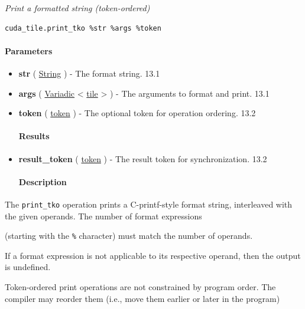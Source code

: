 \documentclass{article}
\begin{document}
\textit{Print a formatted string (token-ordered)}


\begin{lstlisting}
cuda_tile.print_tko %str %args %token
\end{lstlisting}

\paragraph{Parameters}

\begin{itemize}
\item \textbf{str} ( \href{https://docs.nvidia.com/cuda/tile-ir/latest/sections/operations.html#type-string}{String} ) - The format string. 13.1
\item \textbf{args} ( \href{https://docs.nvidia.com/cuda/tile-ir/latest/sections/operations.html#type-variadic}{Variadic} < \href{https://docs.nvidia.com/cuda/tile-ir/latest/sections/types.html#type-tile}{tile} > ) - The arguments to format and print. 13.1
\item \textbf{token} ( \href{https://docs.nvidia.com/cuda/tile-ir/latest/sections/operations.html#type-token}{token} ) - The optional token for operation ordering. 13.2


\paragraph{Results}

\item \textbf{result\_token} ( \href{https://docs.nvidia.com/cuda/tile-ir/latest/sections/operations.html#type-token}{token} ) - The result token for synchronization. 13.2


\paragraph{Description}

\end{itemize}
The \texttt{print\_tko} operation prints a C-printf-style format string, interleaved with the given operands. The number of format expressions

(starting with the \texttt{\%} character) must match the number of operands.

If a format expression is not applicable to its respective operand, then the output is undefined.


Token-ordered print operations are not constrained by program order. The compiler may reorder them (i.e., move them earlier or later in the program)
\end{document}
